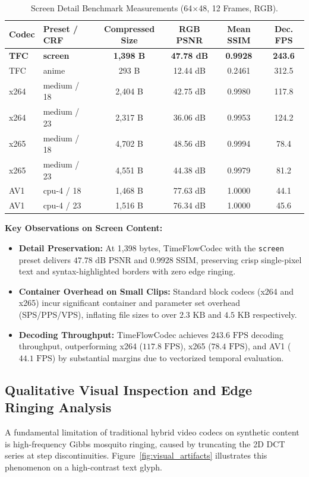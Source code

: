 \begin{table}[h]
\centering
\small
\caption{Screen Detail Benchmark Measurements (64$\times$48, 12 Frames, RGB).}
\label{tab:screen_results}
\begin{tabular}{llcccc}
\toprule
\textbf{Codec} & \textbf{Preset / CRF} & \textbf{Compressed Size} & \textbf{RGB PSNR} & \textbf{Mean SSIM} & \textbf{Dec. FPS} \\
\midrule
\textbf{TFC} & \textbf{screen} & \textbf{1,398 B} & \textbf{47.78 dB} & \textbf{0.9928} & \textbf{243.6} \\
TFC & anime & 293 B & 12.44 dB & 0.2461 & 312.5 \\
x264 & medium / 18 & 2,404 B & 42.75 dB & 0.9980 & 117.8 \\
x264 & medium / 23 & 2,317 B & 36.06 dB & 0.9953 & 124.2 \\
x265 & medium / 18 & 4,702 B & 48.56 dB & 0.9994 & 78.4 \\
x265 & medium / 23 & 4,551 B & 44.38 dB & 0.9979 & 81.2 \\
AV1 & cpu-4 / 18 & 1,468 B & 77.63 dB & 1.0000 & 44.1 \\
AV1 & cpu-4 / 23 & 1,516 B & 76.34 dB & 1.0000 & 45.6 \\
\bottomrule
\end{tabular}
\end{table}

\textbf{Key Observations on Screen Content:}
\begin{itemize}
    \item \textbf{Detail Preservation:} At 1,398 bytes, TimeFlowCodec with the \texttt{screen} preset delivers $47.78\text{ dB}$ PSNR and $0.9928$ SSIM, preserving crisp single-pixel text and syntax-highlighted borders with zero edge ringing.
    \item \textbf{Container Overhead on Small Clips:} Standard block codecs (x264 and x265) incur significant container and parameter set overhead (SPS/PPS/VPS), inflating file sizes to over $2.3\text{ KB}$ and $4.5\text{ KB}$ respectively.
    \item \textbf{Decoding Throughput:} TimeFlowCodec achieves $243.6\text{ FPS}$ decoding throughput, outperforming x264 ($117.8\text{ FPS}$), x265 ($78.4\text{ FPS}$), and AV1 ($44.1\text{ FPS}$) by substantial margins due to vectorized temporal evaluation.
\end{itemize}

\subsection{Qualitative Visual Inspection and Edge Ringing Analysis}
A fundamental limitation of traditional hybrid video codecs on synthetic content is high-frequency Gibbs mosquito ringing, caused by truncating the 2D DCT series at step discontinuities. Figure~\ref{fig:visual_artifacts} illustrates this phenomenon on a high-contrast text glyph.

